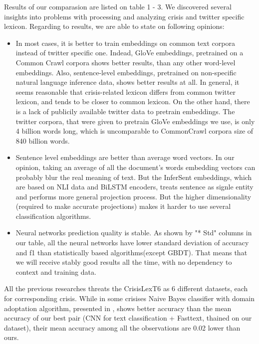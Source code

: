 \documentclass[unicode, 12pt, a4paper,oneside]{article}
\begin{document}
	Results of our comparasion are listed on table 1 - 3. We discovered several insights into problems with processing and analyzing crisis and twitter specific lexicon. Regarding to results, we are able to state on following opinions:\\
	\begin{itemize}
	\item In most cases, it is better to train embeddings on common text corpora instead of twitter specific one. Indead, GloVe embeddings, pretrained on a Common Crawl corpora shows better results, than any other word-level embeddings. Also, sentence-level embeddings, pretrained on non-specific natural language inference data, shows better results at all. In general, it seems reasonable that crisis-related lexicon differs from common twitter lexicon, and tends to be closer to common lexicon. On the other hand, there is a lack of publicily available twitter data to pretrain embeddings. The twitter corpora, that were given to pretrain GloVe embeddings we use, is only 4 billion words long, which is uncomparable to CommonCrawl corpora size of 840 billion words.
	\item Sentence level embeddings are better than average word vectors. In our opinion, taking an average of all the document's words embedding vectors can probably blur the real meaning of text. But the InferSent embeddings, which are based on NLI data and BiLSTM encoders, treats sentence as signle entity and performs more general projection process. But the higher dimensionality (required to make accurate projections) makes it harder to use several classification algorithms.
	\item Neural networks prediction quality is stable. As shown by "* Std" columns in our table, all the neural networks have lower standard deviation of accuracy and f1 than statistically based algorithms(except GBDT). That means that we will receive stably good results all the time, with no dependency to context and training data.
	\end{itemize}

	All the previous researches \cite{dsieve, semi, domain} threats the CrisisLexT6 as 6 different datasets, each for corresponding crisis. While in some crisises Naive Bayes classifier with domain adoptation algorithm, presented in \cite{domain}, shows better accuracy than the mean accuracy of our best pair (CNN for text classification + Fasttext, thained on our dataset), their mean accuracy among all the observations are 0.02 lower than ours.
\end{document}
